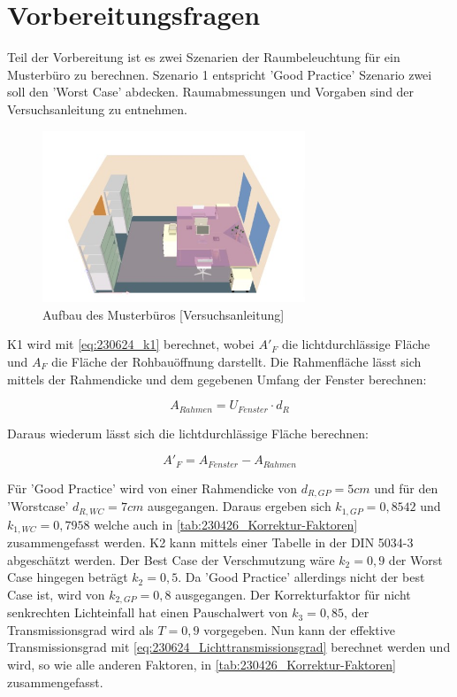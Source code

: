 \section{Vorbereitungsfragen}
\label{sec:Vorbereitungsfragen}

Teil der Vorbereitung ist es zwei Szenarien der Raumbeleuchtung für ein Musterbüro zu berechnen. 
Szenario 1 entspricht 'Good Practice' Szenario zwei soll den 'Worst Case' abdecken.
Raumabmessungen und Vorgaben sind der Versuchsanleitung zu entnehmen.

\begin{figure}[H]
    \centering
    \includegraphics[width=0.7\textwidth]{Abbildungen/Raumaufbau.jpg}
    \caption{Aufbau des Musterbüros [Versuchsanleitung] }
    \label{fig:abb5}
\end{figure}


K1 wird mit \autoref{eq:230624_k1} berechnet, wobei $A'_F$ die lichtdurchlässige Fläche und $A_F$ die Fläche der Rohbauöffnung darstellt.
Die Rahmenfläche lässt sich mittels der Rahmendicke und dem gegebenen Umfang der Fenster berechnen: 

\begin{equation}
    A_{Rahmen} = U_{Fenster} \cdot d_R
\end{equation}

Daraus wiederum lässt sich die lichtdurchlässige Fläche berechnen:  


\begin{equation}
    A'_F = A_{Fenster} - A_{Rahmen}
\end{equation}

Für 'Good Practice' wird von einer Rahmendicke von $d_{R,GP} = 5cm$ und für den 'Worstcase' $d_{R,WC} = 7 cm$ ausgegangen.
Daraus ergeben sich $k_{1,GP} = 0,8542$ und $k_{1,WC} = 0,7958$ welche auch in \autoref{tab:230426_Korrektur-Faktoren} zusammengefasst werden.
K2 kann mittels einer Tabelle in der DIN 5034-3 abgeschätzt werden.
Der Best Case der Verschmutzung wäre $k_2 = 0,9$ der Worst Case hingegen beträgt $k_2 = 0,5$.
Da 'Good Practice' allerdings nicht der best Case ist, wird von $k_{2,GP} = 0,8$ ausgegangen.
Der Korrekturfaktor für nicht senkrechten Lichteinfall hat einen Pauschalwert von $k_3 = 0,85$, der Transmissionsgrad wird als $T = 0,9$ vorgegeben.
Nun kann der effektive Transmissionsgrad mit \autoref{eq:230624_Lichttransmissionsgrad} berechnet werden und wird, so wie alle anderen Faktoren, in \autoref{tab:230426_Korrektur-Faktoren} zusammengefasst.


